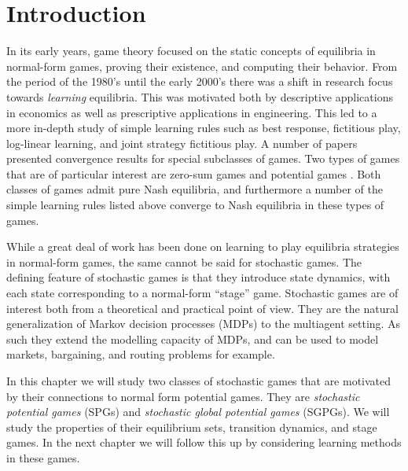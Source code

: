 \section{Introduction}

In its early years, game theory focused on the static concepts of equilibria in normal-form games, proving their existence, and computing their behavior. From the period of the 1980's until the early 2000's there was a shift in research focus towards {\em learning} equilibria. This was motivated both by descriptive applications in economics as well as prescriptive applications in engineering. This led to a more in-depth study of simple learning rules such as best response, fictitious play, log-linear learning, and joint strategy fictitious play. A number of papers presented convergence results for special subclasses of games. Two types of games that are of particular interest are zero-sum games \cite{nash1951non} and potential games \cite{monderer1996potential}. Both classes of games admit pure Nash equilibria, and furthermore a number of the simple learning rules listed above converge to Nash equilibria in these types of games.

While a great deal of work has been done on learning to play equilibria strategies in normal-form games, the same cannot be said for stochastic games. The defining feature of stochastic games is that they introduce state dynamics, with each state corresponding to a normal-form ``stage'' game. Stochastic games are of interest both from a theoretical and practical point of view. They are the natural generalization of Markov decision processes (MDPs) to the multiagent setting. As such they extend the modelling capacity of MDPs, and can be used to model markets, bargaining, and routing problems for example.

In this chapter we will study two classes of stochastic games that are motivated by their connections to normal form potential games. They are {\em stochastic potential games} (SPGs) and {\em stochastic global potential games} (SGPGs).  We will study the properties of their equilibrium sets, transition dynamics, and stage games. In the next chapter we will follow this up by considering learning methods in these games.

